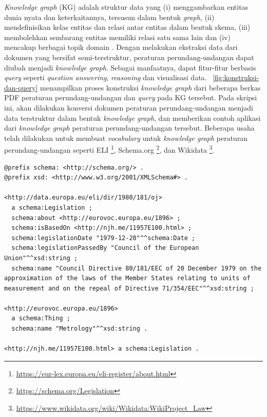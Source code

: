 \textit{Knowledge graph} (KG) adalah struktur data yang (i) menggambarkan entitas dunia nyata dan
keterkaitannya, tersusun dalam bentuk \textit{graph}, (ii) mendefinisikan kelas entitas dan relasi
antar entitas dalam bentuk skema, (iii) membolehkan sembarang entitas memiliki relasi satu sama lain
dan (iv) mencakup berbagai topik domain \citep{paulheim_2016}. Dengan melakukan ekstraksi data dari
dokumen yang bersifat semi-terstruktur, peraturan perundang-undangan dapat diubah menjadi
\textit{knowledge graph}. Sebagai manfaatnya, dapat fitur-fitur berbasis \textit{query} seperti
\textit{question answering}, \textit{reasoning} dan visualisasi data.
\pic~\ref{fig:konstruksi-dan-query} menampilkan proses konstruksi \textit{knowledge graph} dari
beberapa berkas PDF peraturan perundang-undangan dan \textit{query} pada KG tersebut. Pada skripsi
ini, akan dilakukan konversi dokumen peraturan perundang-undangan menjadi data terstruktur dalam
bentuk \textit{knowledge graph}, dan memberikan contoh aplikasi dari \textit{knowledge graph}
peraturan perundang-undangan tersebut. Beberapa usaha telah dilakukan untuk membuat
\textit{vocabulary} untuk \textit{knowledge graph} peraturan perundang-undangan seperti ELI
\footnote{\url{https://eur-lex.europa.eu/eli-register/about.html} }, Schema.org
\footnote{\url{https://schema.org/Legislation} }, dan Wikidata
\footnote{\url{https://www.wikidata.org/wiki/Wikidata:WikiProject_Law} }.


\begin{listing}[H]
  \begin{verbatim}
@prefix schema: <http://schema.org/> .
@prefix xsd: <http://www.w3.org/2001/XMLSchema#> .

<http://data.europa.eu/eli/dir/1980/181/oj>
  a schema:Legislation ;
  schema:about <http://eurovoc.europa.eu/1896> ;
  schema:isBasedOn <http://njh.me/11957E100.html> ;
  schema:legislationDate "1979-12-20"^^schema:Date ;
  schema:legislationPassedBy "Council of the European Union"^^xsd:string ;
  schema:name "Council Directive 80/181/EEC of 20 December 1979 on the approximation of the laws of the Member States relating to units of measurement and on the repeal of Directive 71/354/EEC"^^xsd:string ;

<http://eurovoc.europa.eu/1896>
  a schema:Thing ;
  schema:name "Metrology"^^xsd:string .

<http://njh.me/11957E100.html> a schema:Legislation .
  \end{verbatim}
  \caption{Contoh KG tentang metadata untuk suatu dokumen legal dengan \textit{vocabulary}
    Schema.org}
  \label{listing:schema-org-example}
\end{listing}

